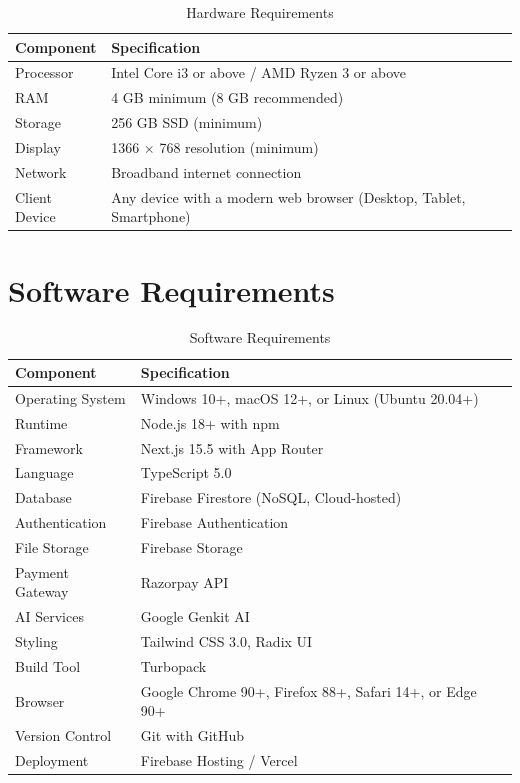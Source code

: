 \documentclass[a4paper,12pt,oneside]{report}
\begin{document}
\begin{table}[h!]
\centering
\caption{Hardware Requirements}
\label{tab:hardware}
\begin{tabular}{|p{4cm}|p{8cm}|}
\hline
\textbf{Component} & \textbf{Specification} \\
\hline
Processor & Intel Core i3 or above / AMD Ryzen 3 or above \\
\hline
RAM & 4 GB minimum (8 GB recommended) \\
\hline
Storage & 256 GB SSD (minimum) \\
\hline
Display & 1366 $\times$ 768 resolution (minimum) \\
\hline
Network & Broadband internet connection \\
\hline
Client Device & Any device with a modern web browser (Desktop, Tablet, Smartphone) \\
\hline
\end{tabular}
\end{table}

\section{Software Requirements}

\begin{table}[h!]
\centering
\caption{Software Requirements}
\label{tab:software}
\begin{tabular}{|p{4cm}|p{8cm}|}
\hline
\textbf{Component} & \textbf{Specification} \\
\hline
Operating System & Windows 10+, macOS 12+, or Linux (Ubuntu 20.04+) \\
\hline
Runtime & Node.js 18+ with npm \\
\hline
Framework & Next.js 15.5 with App Router \\
\hline
Language & TypeScript 5.0 \\
\hline
Database & Firebase Firestore (NoSQL, Cloud-hosted) \\
\hline
Authentication & Firebase Authentication \\
\hline
File Storage & Firebase Storage \\
\hline
Payment Gateway & Razorpay API \\
\hline
AI Services & Google Genkit AI \\
\hline
Styling & Tailwind CSS 3.0, Radix UI \\
\hline
Build Tool & Turbopack \\
\hline
Browser & Google Chrome 90+, Firefox 88+, Safari 14+, or Edge 90+ \\
\hline
Version Control & Git with GitHub \\
\hline
Deployment & Firebase Hosting / Vercel \\
\hline
\end{tabular}
\end{table}
\end{document}
